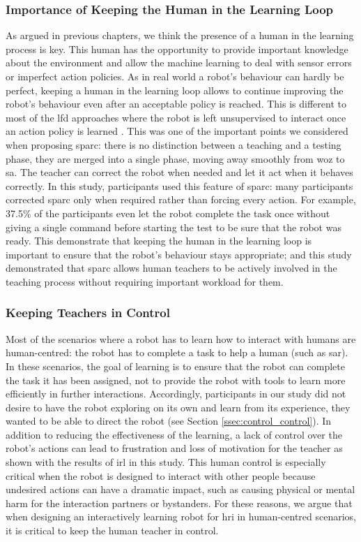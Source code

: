 \subsubsection{Importance of Keeping the Human in the Learning Loop}

As argued in previous chapters, we think the presence of a human in the learning process is key. This human has the opportunity to provide important knowledge about the environment and allow the machine learning to deal with sensor errors or imperfect action policies. As in real world a robot's behaviour can hardly be perfect, keeping a human in the learning loop allows to continue improving the robot's behaviour even after an acceptable policy is reached. This is different to most of the \gls{lfd} approaches where the robot is left unsupervised to interact once an action policy is learned \citep{argall2009survey,sequeira2016discovering}. This was one of the important points we considered when proposing \gls{sparc}: there is no distinction between a teaching and a testing phase, they are merged into a single phase, moving away smoothly from \gls{woz} to \gls{sa}. The teacher can correct the robot when needed and let it act when it behaves correctly. In this study, participants used this feature of \gls{sparc}: many participants corrected \gls{sparc} only when required rather than forcing every action. For example, 37.5\% of the participants even let the robot complete the task once without giving a single command before starting the test to be sure that the robot was ready. This demonstrate that keeping the human in the learning loop is important to ensure that the robot's behaviour stays appropriate; and this study demonstrated that \gls{sparc} allows human teachers to be actively involved in the teaching process without requiring important workload for them.

\subsubsection{Keeping Teachers in Control}

Most of the scenarios where a robot has to learn how to interact with humans are human-centred: the robot has to complete a task to help a human (such as \gls{sar}). In these scenarios, the goal of learning is to ensure that the robot can complete the task it has been assigned, not to provide the robot with tools to learn more efficiently in further interactions. Accordingly, participants in our study did not desire to have the robot exploring on its own and learn from its experience, they wanted to be able to direct the robot (see Section \ref{ssec:control_control}). In addition to reducing the effectiveness of the learning, a lack of control over the robot's actions can lead to frustration and loss of motivation for the teacher as shown with the results of \gls{irl} in this study. This human control is especially critical when the robot is designed to interact with other people because undesired actions can have a dramatic impact, such as causing physical or mental harm for the interaction partners or bystanders. For these reasons, we argue that when designing an interactively learning robot for \gls{hri} in human-centred scenarios, it is critical to keep the human teacher in control. 

